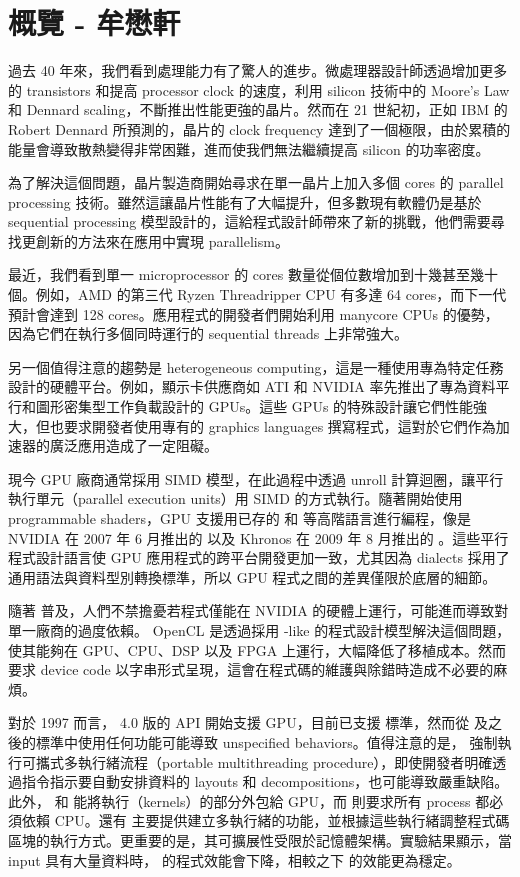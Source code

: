 \chapter{概覽 - 牟懋軒}

過去 40 年來，我們看到處理能力有了驚人的進步。微處理器設計師透過增加更多的 transistors 和提高 processor clock 的速度，利用 silicon 技術中的 Moore's Law 和 Dennard scaling，不斷推出性能更強的晶片。然而在 21 世紀初，正如 IBM 的 Robert Dennard 所預測的，晶片的 clock frequency 達到了一個極限，由於累積的能量會導致散熱變得非常困難，進而使我們無法繼續提高 silicon 的功率密度。

為了解決這個問題，晶片製造商開始尋求在單一晶片上加入多個 cores 的 parallel processing 技術。雖然這讓晶片性能有了大幅提升，但多數現有軟體仍是基於 sequential processing 模型設計的，這給程式設計師帶來了新的挑戰，他們需要尋找更創新的方法來在應用中實現 parallelism。

最近，我們看到單一 microprocessor 的 cores 數量從個位數增加到十幾甚至幾十個。例如，AMD 的第三代 Ryzen Threadripper CPU 有多達 64 cores，而下一代預計會達到 128 cores。應用程式的開發者們開始利用 manycore CPUs 的優勢，因為它們在執行多個同時運行的 sequential threads 上非常強大。

另一個值得注意的趨勢是 heterogeneous computing，這是一種使用專為特定任務設計的硬體平台。例如，顯示卡供應商如 ATI 和 NVIDIA 率先推出了專為資料平行和圖形密集型工作負載設計的 GPUs。這些 GPUs 的特殊設計讓它們性能強大，但也要求開發者使用專有的 graphics languages 撰寫程式，這對於它們作為加速器的廣泛應用造成了一定阻礙。

現今 GPU 廠商通常採用 SIMD 模型，在此過程中透過 unroll 計算迴圈，讓平行執行單元（parallel execution units）用 SIMD 的方式執行。隨著開始使用 programmable shaders，GPU 支援用已存的  和  等高階語言進行編程，像是 NVIDIA 在 2007 年 6 月推出的  以及 Khronos 在 2009 年 8 月推出的 。這些平行程式設計語言使 GPU 應用程式的跨平台開發更加一致，尤其因為  dialects 採用了通用語法與資料型別轉換標準，所以 GPU 程式之間的差異僅限於底層的細節。

隨著  普及，人們不禁擔憂若程式僅能在 NVIDIA 的硬體上運行，可能進而導致對單一廠商的過度依賴。 OpenCL 是透過採用 -like 的程式設計模型解決這個問題，使其能夠在 GPU、CPU、DSP 以及 FPGA 上運行，大幅降低了移植成本。然而  要求 device code 以字串形式呈現，這會在程式碼的維護與除錯時造成不必要的麻煩。

對於  1997 而言， 4.0 版的 API 開始支援 GPU，目前已支援  標準，然而從  及之後的標準中使用任何功能可能導致 unspecified behaviors。值得注意的是， 強制執行可攜式多執行緒流程（portable multithreading procedure），即使開發者明確透過指令指示要自動安排資料的 layouts 和 decompositions，也可能導致嚴重缺陷。此外， 和  能將執行（kernels）的部分外包給 GPU，而  則要求所有 process 都必須依賴 CPU。還有  主要提供建立多執行緒的功能，並根據這些執行緒調整程式碼區塊的執行方式。更重要的是，其可擴展性受限於記憶體架構。實驗結果顯示，當 input 具有大量資料時， 的程式效能會下降，相較之下  的效能更為穩定。

